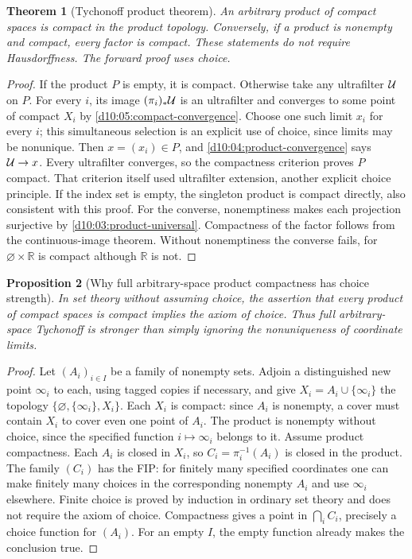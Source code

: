 \documentclass[11pt,oneside,openany]{book}
\newtheorem{theorem}{Theorem}[chapter]
\newtheorem{proposition}[theorem]{Proposition}
\theoremstyle{definition}
\theoremstyle{remark}
\newcommand{\R}{\mathbb R}\newcommand{\C}{\mathbb C}
\begin{document}
\begin{theorem}[Tychonoff product theorem]\label{d10:05:tychonoff}
An arbitrary product of compact spaces is compact in the product topology. Conversely, if a product is nonempty and compact, every factor is compact. These statements do not require Hausdorffness. The forward proof uses choice.
\end{theorem}
\begin{proof}
If the product $P$ is empty, it is compact. Otherwise take any ultrafilter $\mathcal U$ on $P$. For every $i$, its image $(\pi_i)_*\mathcal U$ is an ultrafilter and converges to some point of compact $X_i$ by \cref{d10:05:compact-convergence}. Choose one such limit $x_i$ for every $i$; this simultaneous selection is an explicit use of choice, since limits may be nonunique. Then $x=(x_i)\in P$, and \cref{d10:04:product-convergence} says $\mathcal U\to x$. Every ultrafilter converges, so the compactness criterion proves $P$ compact. That criterion itself used ultrafilter extension, another explicit choice principle. If the index set is empty, the singleton product is compact directly, also consistent with this proof. For the converse, nonemptiness makes each projection surjective by \cref{d10:03:product-universal}. Compactness of the factor follows from the continuous-image theorem. Without nonemptiness the converse fails, for $\varnothing\times\R$ is compact although $\R$ is not.
\end{proof}

\begin{proposition}[Why full arbitrary-space product compactness has choice strength]\label{d10:05:choice-strength}
In set theory without assuming choice, the assertion that every product of compact spaces is compact implies the axiom of choice. Thus full arbitrary-space Tychonoff is stronger than simply ignoring the nonuniqueness of coordinate limits.
\end{proposition}
\begin{proof}
Let $(A_i)_{i\in I}$ be a family of nonempty sets. Adjoin a distinguished new point $\infty_i$ to each, using tagged copies if necessary, and give $X_i=A_i\cup\{\infty_i\}$ the topology $\{\varnothing,\{\infty_i\},X_i\}$. Each $X_i$ is compact: since $A_i$ is nonempty, a cover must contain $X_i$ to cover even one point of $A_i$. The product is nonempty without choice, since the specified function $i\mapsto\infty_i$ belongs to it. Assume product compactness. Each $A_i$ is closed in $X_i$, so $C_i=\pi_i^{-1}(A_i)$ is closed in the product. The family $(C_i)$ has the FIP: for finitely many specified coordinates one can make finitely many choices in the corresponding nonempty $A_i$ and use $\infty_i$ elsewhere. Finite choice is proved by induction in ordinary set theory and does not require the axiom of choice. Compactness gives a point in $\bigcap_i C_i$, precisely a choice function for $(A_i)$. For an empty $I$, the empty function already makes the conclusion true.
\end{proof}
\end{document}
